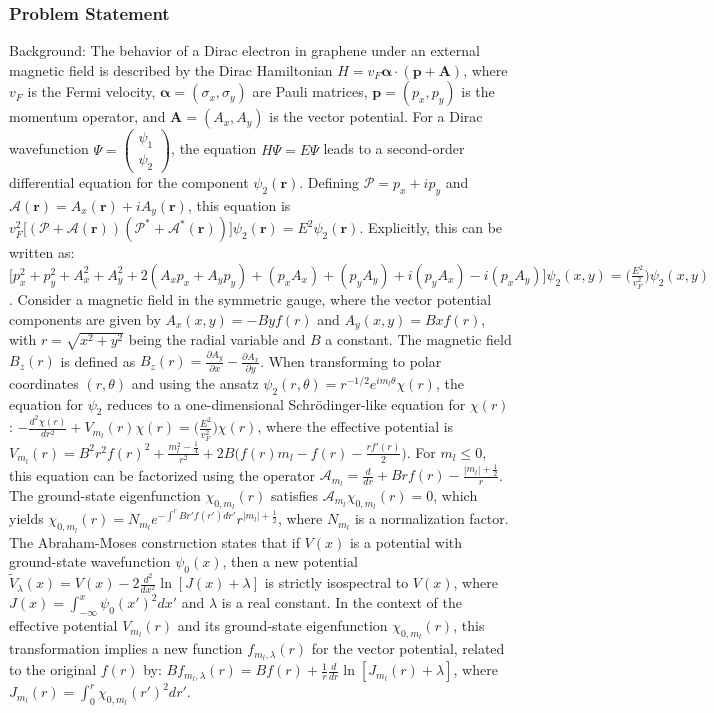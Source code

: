 \documentclass[10pt]{article}
\begin{document}
\subsubsection*{Problem Statement}
Background:
The behavior of a Dirac electron in graphene under an external magnetic field is described by the Dirac Hamiltonian $H = v_F \mathbf{\alpha} \cdot (\mathbf{p} + \mathbf{A} )$, where $v_F$ is the Fermi velocity, $\mathbf{\alpha} = (\sigma_x, \sigma_y)$ are Pauli matrices, $\mathbf{p} = (p_x, p_y)$ is the momentum operator, and $\mathbf{A} = (A_x, A_y)$ is the vector potential. For a Dirac wavefunction $\Psi = \begin{pmatrix} \psi_1 \\ \psi_2 \end{pmatrix}$, the equation $H \Psi = E \Psi$ leads to a second-order differential equation for the component $\psi_2(\mathbf{r})$. Defining $\mathcal{P} = p_x + i p_y$ and $\mathcal{A}(\mathbf{r}) = A_x(\mathbf{r}) + i A_y (\mathbf{r})$, this equation is $v_F^2 \big[(\mathcal{P} + \mathcal{A}(\mathbf{r})) (\mathcal{P}^* + \mathcal{A}^*(\mathbf{r}))\big] \psi_2(\mathbf{r}) = E^2 \psi_2(\mathbf{r})$. Explicitly, this can be written as:
$\bigg[ p_x^2 + p_y^2 + A_x^2 + A_y^2 + 2 (A_x p_x + A_y p_y) + (p_xA_x) + (p_yA_y) + i (p_y A_x) - i (p_x A_y) \bigg] \psi_2(x,y) = \bigg( \frac{E^2 }{v_F^2} \bigg) \psi_2(x,y)$.
Consider a magnetic field in the symmetric gauge, where the vector potential components are given by $A_x(x,y) = - By f(r)$ and $A_y(x,y) = Bx f(r)$, with $r = \sqrt{x^2 + y^2}$ being the radial variable and $B$ a constant. The magnetic field $B_z(r)$ is defined as $B_z(r) = \frac{\partial A_y}{\partial x} - \frac{\partial A_x}{\partial y}$.
When transforming to polar coordinates $(r, \theta)$ and using the ansatz $\psi_2(r,\theta) = r^{-1/2} e^{im_l \theta} \chi(r)$, the equation for $\psi_2$ reduces to a one-dimensional Schr\"odinger-like equation for $\chi(r)$:
$- \frac{d^2 \chi(r)}{dr^2} + V_{m_l}(r) \chi(r) = \bigg( \frac{E^2 }{v_F^2} \bigg) \chi(r)$, where the effective potential is $V_{m_l}(r) = B^2 r^2 f(r)^2 + \frac{m_l^2 - \frac{1}{4}}{r^2} + 2 B \bigg( f(r) m_l - f(r) - \frac{r f'(r)}{2}\bigg)$.
For $m_l \leq 0$, this equation can be factorized using the operator $\mathcal{A}_{m_l} = \frac{d}{d r} + B r f(r) - \frac{|m_l| + \frac{1}{2}}{r}$. The ground-state eigenfunction $\chi_{0,m_l}(r)$ satisfies $\mathcal{A}_{m_l} \chi_{0,m_l}(r) = 0$, which yields $\chi_{0,m_l}(r) = N_{m_l} e^{- \int^r B r' f(r') dr'} r^{|m_l| + \frac{1}{2}}$, where $N_{m_l}$ is a normalization factor.
The Abraham-Moses construction states that if $V(x)$ is a potential with ground-state wavefunction $\psi_0(x)$, then a new potential $\tilde{V}_\lambda(x) = V(x) - 2 \frac{d^2}{dx^2} \ln [J(x) + \lambda]$ is strictly isospectral to $V(x)$, where $J(x) = \int_{-\infty}^x \psi_0(x')^2 dx'$ and $\lambda$ is a real constant. In the context of the effective potential $V_{m_l}(r)$ and its ground-state eigenfunction $\chi_{0,m_l}(r)$, this transformation implies a new function $f_{m_l,\lambda}(r)$ for the vector potential, related to the original $f(r)$ by: $B f_{m_l,\lambda}(r) = B f(r) + \frac{1}{r} \frac{d}{d r} \ln [J_{m_l}(r) + \lambda]$, where $J_{m_l}(r) = \int_0^r \chi_{0,m_l}(r')^2 dr'$.
\end{document}
